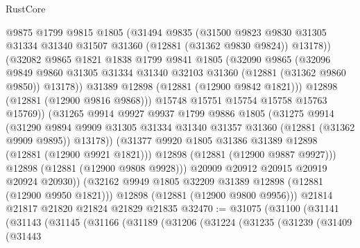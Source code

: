 \begin{lexlean}{RustCore}
\begin{coremodule}
                  @9875
                  @1799
                  @9815
                  @1805
                  (@31494
                    @9835
                    (@31500
                      @9823
                      @9830
                      @31305
                      @31334
                      @31340
                      @31507
                      @31360
                      (@12881 (@31362 @9830 @9824))
                      @13178))
                  (@32082
                    @9865
                    @1821
                    @1838
                    @1799
                    @9841
                    @1805
                    (@32090
                      @9865
                      (@32096
                        @9849
                        @9860
                        @31305
                        @31334
                        @31340
                        @32103
                        @31360
                        (@12881 (@31362 @9860 @9850))
                        @13178))
                    @31389
                    @12898
                    (@12881 (@12900 @9842 @1821)))
                  @12898
                  (@12881 (@12900 @9816 @9868)))
                @15748
                @15751
                @15754
                @15758
                @15763
                @15769))
            (@31265
              @9914
              @9927
              @9937
              @1799
              @9886
              @1805
              (@31275
                @9914
                (@31290
                  @9894
                  @9909
                  @31305
                  @31334
                  @31340
                  @31357
                  @31360
                  (@12881 (@31362 @9909 @9895))
                  @13178))
              (@31377 @9920 @1805 @31386 @31389 @12898 (@12881 (@12900 @9921 @1821)))
              @12898
              (@12881 (@12900 @9887 @9927)))
            @12898
            (@12881 (@12900 @9808 @9928)))
          @20909
          @20912
          @20915
          @20919
          @20924
          @20930))
      (@32162 @9949 @1805 @32209 @31389 @12898 (@12881 (@12900 @9950 @1821)))
      @12898
      (@12881 (@12900 @9800 @9956)))
    @21814
    @21817
    @21820
    @21824
    @21829
    @21835
@32470 := @31075
    (@31100
      (@31141
        (@31143
          (@31145
            (@31166
              (@31189
                (@31206
                  (@31224
                    (@31235
                      (@31239
                        (@31409
                          (@31443

\end{coremodule}
\end{lexlean}

